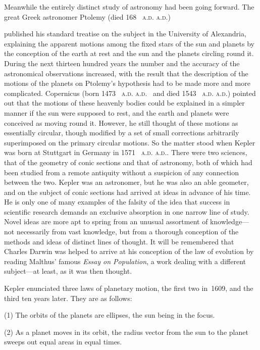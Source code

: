 \documentclass[12pt,leqno]{book}[2005/09/16]
\makeatletter
\newcommand{\Chg}[2]{#2}
\newcommand{\Add}[1]{\Chg{}{#1}}
\newcommand{\PageSep}[1]{\ignorespaces}
\newcommand{\Title}[1]{\textit{#1}}
\newcommand{\SCAbbrev}[3]{%
  \ifthenelse{\equal{#3}{.}}%
  {\textsc{\MakeLowercase{#1.#2}.}}%
  {\textsc{\MakeLowercase{#1.#2}.}\@#3}%
}
\newcommand{\AD}[1]{\SCAbbrev{A}{D}{#1}}
\makeatother
\begin{document}
Meanwhile the entirely distinct study of
astronomy had been going forward. The
%
great Greek astronomer Ptolemy (died 168~\AD)
%
published his standard treatise on the
subject in the University of Alexandria, explaining
the apparent motions among the
fixed stars of the sun and planets by the conception
of the earth at rest and the sun and
the planets circling round it. During the
next thirteen hundred years the number and
the accuracy of the astronomical observations
increased, with the result that the description
of the motions of the planets on
Ptolemy's hypothesis had to be made more
and more complicated. Copernicus (born
%
1473~\AD\ and died 1543~\AD) pointed out
that the motions of these heavenly bodies
could be explained in a simpler manner if the
sun were supposed to rest, and the earth and
planets were conceived as moving round it.
However, he still thought of these motions as
essentially circular, though modified by a set
of small corrections arbitrarily superimposed
on the primary circular motions. So the
matter stood when Kepler was born at Stuttgart
%
in Germany in 1571~\AD. There were
two sciences, that of the geometry of conic
sections and that of astronomy, both of which
\PageSep{138}
had been studied from a remote antiquity
without a suspicion of any connection between
the two. Kepler was an astronomer,
%
but he was also an able geometer, and on the
subject of conic sections had arrived at ideas
in advance of his time\Add{.} He is only one of
many examples of the falsity of the idea that
success in scientific research demands an exclusive
absorption in one narrow line of study.
Novel ideas are more apt to spring from
an unusual assortment of knowledge---not
necessarily from vast knowledge, but from a
thorough conception of the methods and ideas
of distinct lines of thought. It will be remembered
that Charles Darwin was helped
%
to arrive at his conception of the law of
evolution by reading Malthus' famous \Title{Essay
%
on Population}, a work dealing with a different
subject---at least, as it was then
thought.

Kepler enunciated three laws of planetary
%
motion, the first two in~1609, and the third
ten years later. They are as follows:

(1) The orbits of the planets are ellipses,
the sun being in the focus.

(2) As a planet moves in its orbit, the
radius vector from the sun to the planet
sweeps out equal areas in equal times.
\end{document}
